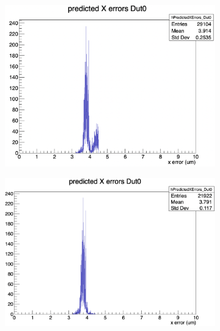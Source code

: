 \begin{figure}[H]
    \centering

    \begin{subfigure}[b]{0.3\textwidth}
        \includegraphics[width=\textwidth]{images/XPredError_13planes.png}
        \caption{}
    \end{subfigure}
    \hfill
    \begin{subfigure}[b]{0.33\textwidth}
        \includegraphics[width=\textwidth]{images/XPredError_4pixel.png}
        \caption{}
    \end{subfigure}
    \hfill
    \begin{subfigure}[b]{0.3\textwidth}

\end{subfigure}
\end{figure}
